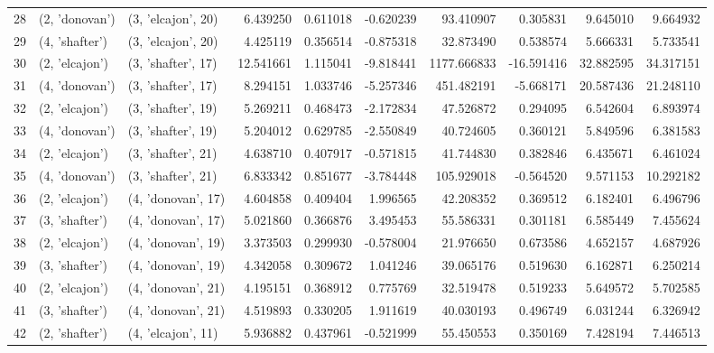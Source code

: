 \begin{tabular}{lllrrrrrrr}
28 &   (2, 'donovan') &  (3, 'elcajon', 20) &   6.439250 &   0.611018 & -0.620239 &    93.410907 &   0.305831 &   9.645010 &   9.664932 \\
29 &   (4, 'shafter') &  (3, 'elcajon', 20) &   4.425119 &   0.356514 & -0.875318 &    32.873490 &   0.538574 &   5.666331 &   5.733541 \\
30 &   (2, 'elcajon') &  (3, 'shafter', 17) &  12.541661 &   1.115041 & -9.818441 &  1177.666833 & -16.591416 &  32.882595 &  34.317151 \\
31 &   (4, 'donovan') &  (3, 'shafter', 17) &   8.294151 &   1.033746 & -5.257346 &   451.482191 &  -5.668171 &  20.587436 &  21.248110 \\
32 &   (2, 'elcajon') &  (3, 'shafter', 19) &   5.269211 &   0.468473 & -2.172834 &    47.526872 &   0.294095 &   6.542604 &   6.893974 \\
33 &   (4, 'donovan') &  (3, 'shafter', 19) &   5.204012 &   0.629785 & -2.550849 &    40.724605 &   0.360121 &   5.849596 &   6.381583 \\
34 &   (2, 'elcajon') &  (3, 'shafter', 21) &   4.638710 &   0.407917 & -0.571815 &    41.744830 &   0.382846 &   6.435671 &   6.461024 \\
35 &   (4, 'donovan') &  (3, 'shafter', 21) &   6.833342 &   0.851677 & -3.784448 &   105.929018 &  -0.564520 &   9.571153 &  10.292182 \\
36 &   (2, 'elcajon') &  (4, 'donovan', 17) &   4.604858 &   0.409404 &  1.996565 &    42.208352 &   0.369512 &   6.182401 &   6.496796 \\
37 &   (3, 'shafter') &  (4, 'donovan', 17) &   5.021860 &   0.366876 &  3.495453 &    55.586331 &   0.301181 &   6.585449 &   7.455624 \\
38 &   (2, 'elcajon') &  (4, 'donovan', 19) &   3.373503 &   0.299930 & -0.578004 &    21.976650 &   0.673586 &   4.652157 &   4.687926 \\
39 &   (3, 'shafter') &  (4, 'donovan', 19) &   4.342058 &   0.309672 &  1.041246 &    39.065176 &   0.519630 &   6.162871 &   6.250214 \\
40 &   (2, 'elcajon') &  (4, 'donovan', 21) &   4.195151 &   0.368912 &  0.775769 &    32.519478 &   0.519233 &   5.649572 &   5.702585 \\
41 &   (3, 'shafter') &  (4, 'donovan', 21) &   4.519893 &   0.330205 &  1.911619 &    40.030193 &   0.496749 &   6.031244 &   6.326942 \\
42 &   (2, 'shafter') &  (4, 'elcajon', 11) &   5.936882 &   0.437961 & -0.521999 &    55.450553 &   0.350169 &   7.428194 &   7.446513 \\

\end{tabular}
